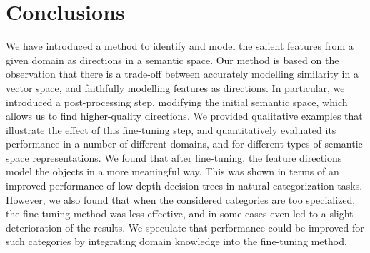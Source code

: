 \section{Conclusions}
We have introduced a method to identify and model the salient features from a given domain as directions in a semantic space. Our method is based on the observation that there is a trade-off between accurately modelling similarity in a vector space, and faithfully modelling features as directions. In particular, we introduced a post-processing step, modifying the initial semantic space, which allows us to find higher-quality directions. We provided qualitative examples that illustrate the effect of this fine-tuning step, and quantitatively evaluated its performance in a number of different domains, and for different types of semantic space representations. We found that after fine-tuning, the feature directions model the objects in a more meaningful way. This was shown in terms of an improved performance of low-depth decision trees in natural categorization tasks. However, we also found that when the considered categories are too specialized, the fine-tuning method was less effective, and in some cases even led to a slight deterioration of the results. We speculate that performance could be improved for such categories by integrating domain knowledge into the fine-tuning method.








